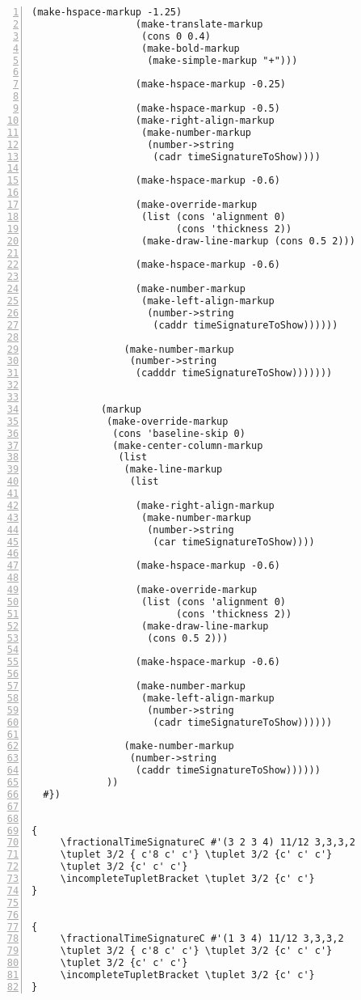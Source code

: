 \begin{Verbatim}[numbers=left,xleftmargin=5mm]
                  (make-hspace-markup -1.25)
                  (make-translate-markup
                   (cons 0 0.4)
                   (make-bold-markup
                    (make-simple-markup "+")))

                  (make-hspace-markup -0.25)

                  (make-hspace-markup -0.5)
                  (make-right-align-markup
                   (make-number-markup
                    (number->string
                     (cadr timeSignatureToShow))))

                  (make-hspace-markup -0.6)

                  (make-override-markup
                   (list (cons 'alignment 0)
                         (cons 'thickness 2))
                   (make-draw-line-markup (cons 0.5 2)))

                  (make-hspace-markup -0.6)

                  (make-number-markup
                   (make-left-align-markup
                    (number->string
                     (caddr timeSignatureToShow))))))

                (make-number-markup
                 (number->string
                  (cadddr timeSignatureToShow)))))))


            (markup
             (make-override-markup
              (cons 'baseline-skip 0)
              (make-center-column-markup
               (list
                (make-line-markup
                 (list

                  (make-right-align-markup
                   (make-number-markup
                    (number->string
                     (car timeSignatureToShow))))

                  (make-hspace-markup -0.6)

                  (make-override-markup
                   (list (cons 'alignment 0)
                         (cons 'thickness 2))
                   (make-draw-line-markup
                    (cons 0.5 2)))

                  (make-hspace-markup -0.6)

                  (make-number-markup
                   (make-left-align-markup
                    (number->string
                     (cadr timeSignatureToShow))))))

                (make-number-markup
                 (number->string
                  (caddr timeSignatureToShow))))))
             ))
  #})


{
     \fractionalTimeSignatureC #'(3 2 3 4) 11/12 3,3,3,2
     \tuplet 3/2 { c'8 c' c'} \tuplet 3/2 {c' c' c'}
     \tuplet 3/2 {c' c' c'}
     \incompleteTupletBracket \tuplet 3/2 {c' c'}
}


{
     \fractionalTimeSignatureC #'(1 3 4) 11/12 3,3,3,2
     \tuplet 3/2 { c'8 c' c'} \tuplet 3/2 {c' c' c'}
     \tuplet 3/2 {c' c' c'}
     \incompleteTupletBracket \tuplet 3/2 {c' c'}
}
\end{Verbatim}

